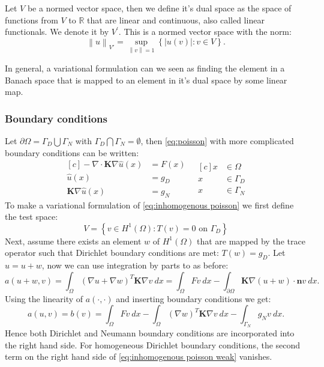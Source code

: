 \documentclass[../Main/main.tex]{subfiles}
\begin{document}
	\begin{definition}
		Let $V$ be a normed vector space, then we define it's dual space as the space of functions from $V$ to $\mathbb{R}$ that are linear and continuous, also called linear functionals. We denote it by $V^{'}$. This is a normed vector space with the norm: \begin{equation*}
\left \| u \right \|_{V'} = \sup_{\left \| v \right \|=1}\left \{ |u(v)|:v\in V \right \}. 		\end{equation*}
	\end{definition}
	In general, a variational formulation can we seen as finding the element in a Banach space that is mapped to an element in it's dual space by some linear map.
	\subsubsection*{Boundary conditions}
	Let $\partial \Omega = \Gamma_D\bigcup \Gamma_N$ with $\Gamma_D \bigcap \Gamma_N = \emptyset$, then \eqref{eq:poisson} with more complicated boundary conditions can be written:
	\begin{equation}\label{eq:inhomogenous poisson}
		\begin{aligned}[c]
			 - \nabla \cdot \bm{K} \nabla \hat{u}(x) &= F(x) \\
			\hat{u}(x) &= g_D \\
			\bm{K}\nabla \hat{u}(x) &= g_N
		\end{aligned}
		\ \ \
		\begin{aligned}[c]
			x &\in \Omega  \\
			x &\in \Gamma_D \\
			x &\in \Gamma_N
		\end{aligned}
	\end{equation}
	To make a variational formulation of \eqref{eq:inhomogenous poisson} we first define the test space:
	\begin{equation*}
		V = \left \{ v\in H^1(\Omega): T(v)=0 \text{ on }\Gamma_D\right \}
	\end{equation*}
	Next, assume there exists an element $w$ of $ H^1(\Omega)$ that are mapped by the trace operator such that Dirichlet boundary conditions are met: $T(w)=g_D$. Let $\hat{u} = u+w$, now we can use integration by parts to as before:
	\begin{equation}
		a(u+w,v) = \int_{\Omega}(\nabla u+\nabla w)^{T}\bm{K} \nabla v \ dx = \int_{\Omega}Fv \ dx -\int_{\partial\Omega}\bm{K}\nabla (u+w)\cdot \bm{n}v \ dx .
	\end{equation}
	Using the linearity of $a(\cdot,\cdot)$ and inserting boundary conditions we get:
	\begin{equation}\label{eq:inhomogenous poisson weak}
		a(u,v) = b(v)= \int_{\Omega} Fv \ dx - \int_{\Omega}(\nabla w)^T\bm{K} \nabla v \ dx - \int_{\Gamma_N} g_N v \ dx.
	\end{equation}
	Hence both Dirichlet and Neumann boundary conditions are incorporated into the right hand side. For homogeneous Dirichlet boundary conditions, the second term on the right hand side of \eqref{eq:inhomogenous poisson weak} vanishes. 
	
\end{document}

